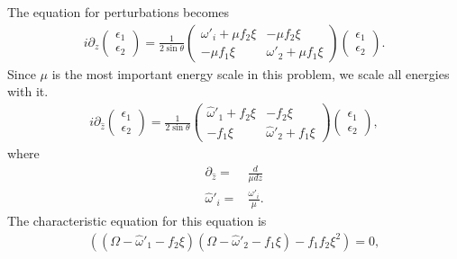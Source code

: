 \documentclass[letterpaper,12pt,english]{sphinxmanual}
\begin{document}
The equation for perturbations becomes
\label{\detokenize{collective/some-clarifications:equation-eqn-linearized-eom-symmetric-eg}}\begin{equation}\label{equation:collective/some-clarifications:eqn-linearized-eom-symmetric-eg}
\begin{split}i\partial_z\begin{pmatrix}
\epsilon_1 \\
\epsilon_2
\end{pmatrix} = \frac{1}{2\sin\theta} \begin{pmatrix}
\omega'_i + \mu f_2\xi & -\mu f_2 \xi \\
-\mu f_1 \xi & \omega'_2 + \mu f_1 \xi
\end{pmatrix}\begin{pmatrix}
\epsilon_1 \\
\epsilon_2
\end{pmatrix}.\end{split}
\end{equation}
Since \(\mu\) is the most important energy scale in this problem, we scale all energies with it.
\begin{equation*}
\begin{split}i\partial_{\hat z}\begin{pmatrix}
\epsilon_1 \\
\epsilon_2
\end{pmatrix} = \frac{1}{2\sin\theta} \begin{pmatrix}
\hat\omega'_1 +  f_2\xi & - f_2 \xi \\
- f_1 \xi & \hat\omega'_2 +  f_1 \xi
\end{pmatrix}\begin{pmatrix}
\epsilon_1 \\
\epsilon_2
\end{pmatrix},\end{split}
\end{equation*}
where
\begin{equation*}
\begin{split}\partial_{\hat z} =& \frac{d}{\mu dz} \\
\hat \omega'_i =& \frac{\omega'_i}{\mu}.\end{split}
\end{equation*}
The characteristic equation for this equation is
\label{\detokenize{collective/some-clarifications:equation-eqn-two-beam-line-characteristic-eqn-simple}}\begin{equation}\label{equation:collective/some-clarifications:eqn-two-beam-line-characteristic-eqn-simple}
\begin{split}\left( ( \Omega - \hat\omega'_1 - f_2\xi )(\Omega - \hat\omega'_2-f_1\xi) - f_1 f_2 \xi^2 \right) =0,\end{split}
\end{equation}
\end{document}
